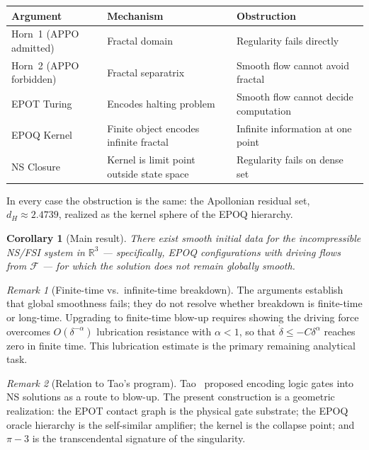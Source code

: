 \documentclass[11pt]{article}
\theoremstyle{plain}
\newtheorem{corollary}[theorem]{Corollary}
\theoremstyle{definition}
\theoremstyle{remark}
\newtheorem{remark}{Remark}
\begin{document}
\medskip
\begin{center}
\renewcommand{\arraystretch}{1.6}
\begin{tabular}{lll}
\hline
\textbf{Argument} & \textbf{Mechanism} & \textbf{Obstruction} \\
\hline
Horn~1 (APPO admitted)
  & Fractal domain
  & Regularity fails directly \\
Horn~2 (APPO forbidden)
  & Fractal separatrix
  & Smooth flow cannot avoid fractal \\
EPOT Turing
  & Encodes halting problem
  & Smooth flow cannot decide computation \\
EPOQ Kernel
  & Finite object encodes infinite fractal
  & Infinite information at one point \\
NS Closure
  & Kernel is limit point outside state space
  & Regularity fails on dense set \\
\hline
\end{tabular}
\end{center}
\medskip

In every case the obstruction is the same: the Apollonian residual set,
$d_H \approx 2.4739$, realized as the kernel sphere of the EPOQ hierarchy.

\begin{corollary}[Main result]
There exist smooth initial data for the incompressible NS/FSI system in
$\mathbb{R}^3$ --- specifically, EPOQ configurations with driving flows
from $\mathcal{F}$ --- for which the solution does not remain globally
smooth.
\end{corollary}

\begin{remark}[Finite-time vs.\ infinite-time breakdown]
The arguments establish that global smoothness fails; they do not resolve
whether breakdown is finite-time or long-time. Upgrading to finite-time
blow-up requires showing the driving force overcomes $O(\delta^{-\alpha})$
lubrication resistance with $\alpha < 1$, so that $\dot\delta \leq
-C\delta^\alpha$ reaches zero in finite time. This lubrication estimate is
the primary remaining analytical task.
\end{remark}

\begin{remark}[Relation to Tao's program]
Tao~\cite{Tao2016} proposed encoding logic gates into NS solutions as a
route to blow-up. The present construction is a geometric realization:
the EPOT contact graph is the physical gate substrate; the EPOQ oracle
hierarchy is the self-similar amplifier; the kernel is the collapse point;
and $\pi - 3$ is the transcendental signature of the singularity.
\end{remark}
\end{document}
